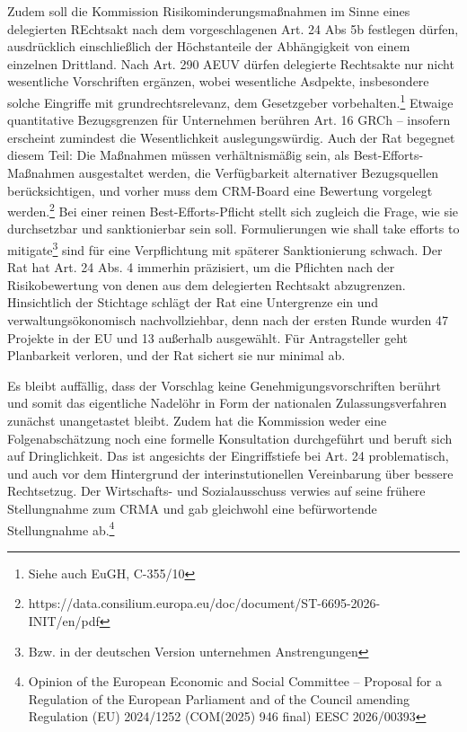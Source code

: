 \documentclass[12pt,a4paper,oneside]{book} %
\begin{document}
Zudem soll die Kommission Risikominderungsmaßnahmen im Sinne eines delegierten REchtsakt nach dem vorgeschlagenen Art. 24 Abs 5b festlegen dürfen, ausdrücklich einschließlich der Höchstanteile der Abhängigkeit von einem einzelnen Drittland. Nach Art. 290 AEUV dürfen delegierte Rechtsakte nur nicht wesentliche Vorschriften ergänzen, wobei wesentliche Asdpekte, insbesondere solche Eingriffe mit grundrechtsrelevanz, dem Gesetzgeber vorbehalten.\footnote{Siehe auch EuGH, C-355/10} Etwaige quantitative Bezugsgrenzen für Unternehmen berühren Art. 16 GRCh -- insofern erscheint zumindest die Wesentlichkeit auslegungswürdig. Auch der Rat begegnet diesem Teil: Die Maßnahmen müssen verhältnismäßig sein, als Best-Efforts-Maßnahmen ausgestaltet werden, die Verfügbarkeit alternativer Bezugsquellen berücksichtigen, und vorher muss dem CRM-Board eine Bewertung vorgelegt werden.\footnote{https://data.consilium.europa.eu/doc/document/ST-6695-2026-INIT/en/pdf} Bei einer reinen Best-Efforts-Pflicht stellt sich zugleich die Frage, wie sie durchsetzbar und sanktionierbar sein soll. Formulierungen wie \glqq shall take efforts to mitigate\grqq\footnote{Bzw. in der deutschen Version \glqq unternehmen Anstrengungen\grqq} sind für eine Verpflichtung mit späterer Sanktionierung schwach. Der Rat hat Art. 24 Abs. 4 immerhin präzisiert, um die Pflichten nach der Risikobewertung von denen aus dem delegierten Rechtsakt abzugrenzen. Hinsichtlich der Stichtage schlägt der Rat eine Untergrenze ein und verwaltungsökonomisch nachvollziehbar, denn nach der ersten Runde wurden 47 Projekte in der EU und 13 außerhalb ausgewählt. Für Antragsteller geht Planbarkeit verloren, und der Rat sichert sie nur minimal ab.

Es bleibt auffällig, dass der Vorschlag keine Genehmigungsvorschriften berührt und somit das eigentliche Nadelöhr in Form der nationalen Zulassungsverfahren zunächst unangetastet bleibt. Zudem hat die Kommission weder eine Folgenabschätzung noch eine formelle Konsultation durchgeführt und beruft sich auf Dringlichkeit. Das ist angesichts der Eingriffstiefe bei Art. 24 problematisch, und auch vor dem Hintergrund der interinstutionellen Vereinbarung über bessere Rechtsetzug. Der Wirtschafts- und Sozialausschuss verwies auf seine frühere Stellungnahme zum CRMA und gab gleichwohl eine befürwortende Stellungnahme ab.\footnote{Opinion of the European Economic and Social Committee – Proposal for a Regulation of the European Parliament and of the Council amending Regulation (EU) 2024/1252 (COM(2025) 946 final) EESC 2026/00393}
\end{document}
